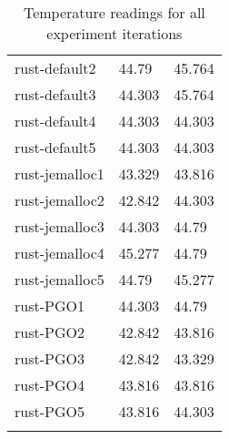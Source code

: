 \begin{longtable}[H]{|lll|}
rust-default2           & 44.79  & 45.764 \\
rust-default3           & 44.303 & 45.764 \\
rust-default4           & 44.303 & 44.303 \\
rust-default5           & 44.303 & 44.303 \\
rust-jemalloc1          & 43.329 & 43.816 \\
rust-jemalloc2          & 42.842 & 44.303 \\
rust-jemalloc3          & 44.303 & 44.79  \\
rust-jemalloc4          & 45.277 & 44.79  \\
rust-jemalloc5          & 44.79  & 45.277 \\
rust-PGO1               & 44.303 & 44.79  \\
rust-PGO2               & 42.842 & 43.816 \\
rust-PGO3               & 42.842 & 43.329 \\
rust-PGO4               & 43.816 & 43.816 \\
rust-PGO5               & 43.816 & 44.303 \\
\hline
\caption{Temperature readings for all experiment iterations}
\end{longtable}
